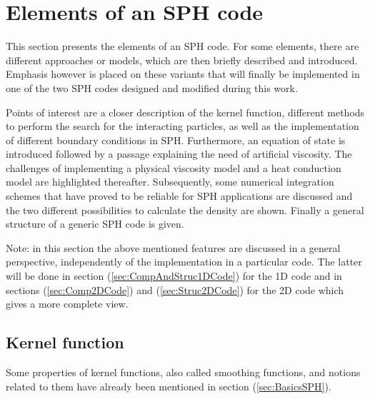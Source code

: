 \documentclass[11pt,a4paper,twoside]{report}
\begin{document}
\section{Elements of an SPH code}
\label{sec:ElementsOfSPH}
This section presents the elements of an SPH code. For some elements, there are different approaches or models, which are then briefly described and introduced. Emphasis however is placed on these variants that will finally be implemented in one of the two SPH codes designed and modified during this work.

Points of interest are a closer description of the kernel function, different methods to perform the search for the interacting particles, as well as the implementation of different boundary conditions in SPH. Furthermore, an
equation of state is introduced followed by a passage
explaining the need of artificial viscosity. The challenges of implementing a physical viscosity model and a heat conduction model are highlighted thereafter. Subsequently, some numerical integration schemes that have proved to be reliable for SPH applications are discussed and the two different possibilities to calculate the density are shown. Finally a general structure of a generic SPH code is given.

Note: in this section the above mentioned features are discussed in a general perspective, independently of the implementation in a particular code. The latter will be done in section (\ref{sec:CompAndStruc1DCode}) for the 1D code and in sections (\ref{sec:Comp2DCode}) and (\ref{sec:Struc2DCode}) for the 2D code which gives a more complete view.




\subsection{Kernel function}
\label{sec:KernelFunction}


Some properties of kernel functions, also called smoothing functions, and notions related to them have already been mentioned in section
(\ref{sec:BasicsSPH}). 
\end{document}
